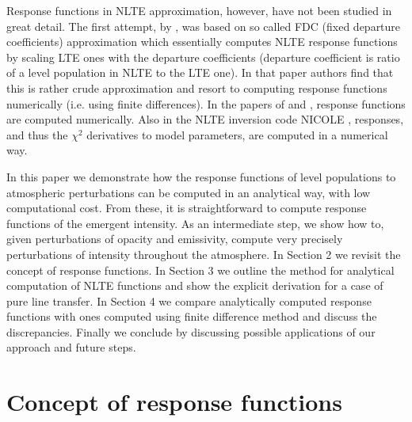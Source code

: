 \documentclass[referee]{aa}
\begin{document}
Response functions in NLTE approximation, however, have not been studied in great detail. The first attempt, by \citet{HectorI}, was based on so called FDC (fixed departure coefficients) approximation which essentially computes NLTE response functions by scaling LTE ones with the departure coefficients (departure coefficient is ratio of a level population in NLTE to the LTE one). In that paper authors find that this is rather crude approximation and resort to computing response functions numerically (i.e. using finite differences). In the papers of \citet{Hector_halpha} and \citet{Han06}, response functions are computed numerically. Also in the NLTE inversion code NICOLE \citep{NICOLE}, responses, and thus the $\chi^2$ derivatives to model parameters, are computed in a numerical way.

In this paper we demonstrate how the response functions of level populations to atmospheric perturbations can be computed in an analytical way, with low computational cost. From these, it is straightforward to compute response functions of the emergent intensity. As an intermediate step, we show how to, given perturbations of opacity and emissivity, compute very precisely perturbations of intensity throughout the atmosphere. In Section 2 we revisit the concept of response functions. In Section 3 we outline the method for analytical computation of NLTE functions and show the explicit derivation for a case of pure line transfer. In Section 4 we compare analytically computed response functions with ones computed using finite difference method and discuss the discrepancies. Finally we conclude by discussing possible applications of our approach and future steps. 

\section{Concept of response functions}
\label{concept}
\end{document}
